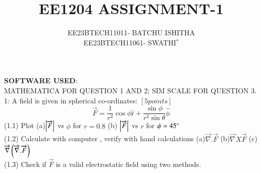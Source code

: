 \documentclass[journal,12pt,onecolumn]{IEEEtran}
\theoremstyle{remark}
\begin{document}
\newcommand\tabref{Table~\ref}
\newcommand{\sinc}{\,\text{sinc}\,}
\newcommand{\rect}{\,\text{rect}\,}

\let\vec\mathbf



\title{ EE1204 ASSIGNMENT-1}
\author{EE23BTECH11011- BATCHU ISHITHA \\ EE23BTECH11061- SWATHI$^{*}$%
}

\maketitle




\bigskip

\renewcommand{\thefigure}{\theenumi}
\renewcommand{\thetable}{\theenumi}
\textbf{SOFTWARE USED}:\\ MATHEMATICA FOR QUESTION 1 AND 2; SIM SCALE FOR QUESTION 3.\\

1: A field is given in spherical co-ordinates: $[5 points]$ 
$$\overrightarrow{F}=\frac{1}{r^2}\cos \phi \mathrm{\hat{r}} + \frac{\sin \phi}{r^2 \sin \theta} \mathrm{\hat{\phi}}$$ 
(1.1) Plot (a)$\left\vert\overrightarrow{F}\right\vert$ vs $\phi$ for $r=0.8$ (b)  $\left\vert\overrightarrow{F}\right\vert$ vs $r$ for $\phi = 45\degree$ \\
(1.2) Calculate with computer , verify with hand calculations (a)$\overrightarrow{\nabla}.\overrightarrow{F}$ (b)$\overrightarrow{\nabla}X\overrightarrow{F} $ (c)$\overrightarrow{\nabla}\left(\overrightarrow{\nabla}.\overrightarrow{F}\right)$ \\
(1.3) Check if $\overrightarrow{F}$ is a valid electrostatic field using two methods. \\
\end{document}
